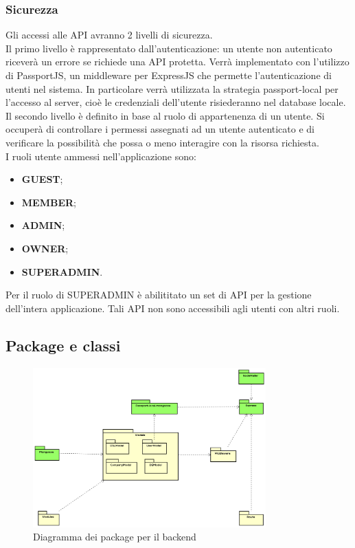 \subsubsection{Sicurezza}
Gli accessi alle API avranno 2 livelli di sicurezza. \\
Il primo livello è rappresentato dall'autenticazione: un utente non autenticato riceverà un errore se richiede una API protetta. Verrà implementato con l'utilizzo di PassportJS, un middleware per ExpressJS che permette l'autenticazione di utenti nel sistema. In particolare verrà utilizzata la strategia passport-local per l'accesso al server, cioè le credenziali dell'utente risiederanno nel database locale. \\
Il secondo livello è definito in base al ruolo di appartenenza di un utente. Si occuperà di controllare i permessi assegnati ad un utente autenticato e di verificare la possibilità che possa o meno interagire con la risorsa richiesta. \\
I ruoli utente ammessi nell'applicazione sono: 
\begin{itemize}
\item \textbf{GUEST};
\item \textbf{MEMBER};
\item \textbf{ADMIN};
\item \textbf{OWNER};
\item \textbf{SUPERADMIN}.
\end{itemize}
Per il ruolo di SUPERADMIN è abilititato un set di API per la gestione dell'intera applicazione. Tali API non sono accessibili agli utenti con altri ruoli.
\subsection{Package e classi}
\begin{figure}[h]
\centering
\includegraphics[width=0.8\textwidth]{res/sections/package.png}
\caption{Diagramma dei package per il backend}
\end{figure}
